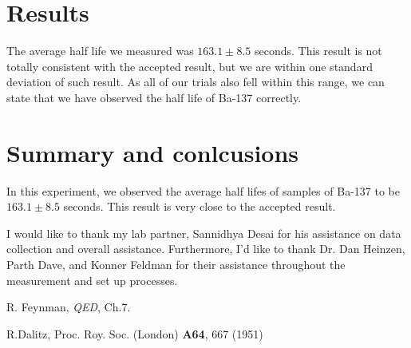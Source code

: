 \documentclass[10pt,letterpaper,onecolumn]{article}
\begin{document}
\newpage





\section{Results}

The average half life we measured was $163.1 \pm 8.5$ seconds. This result 
is not totally consistent with the accepted result, but we are within one 
standard deviation of such result. As all of our trials also fell within this
range, we can state that we have observed the half life of Ba-137 correctly.



\section{Summary and conlcusions}

In this experiment, we observed the average half lifes of samples of Ba-137 to be 
$163.1 \pm 8.5$ seconds. This result is very close to the accepted result.

I would like to thank my lab partner, Sannidhya Desai for his assistance on data
collection and overall assistance. Furthermore, I'd like to thank Dr. Dan Heinzen,
Parth Dave, and Konner Feldman for their assistance throughout the measurement and 
set up processes.


\begin{thebibliography}{9}

 R. Feynman, {\it QED}, Ch.7.

R.Dalitz, Proc. Roy. Soc. (London) {\bf A64}, 667 (1951)

\end{thebibliography}

\end{document}
